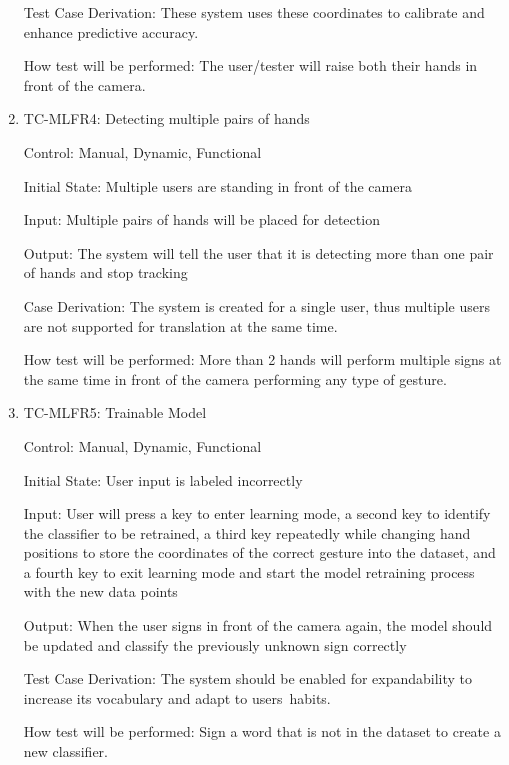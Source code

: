 \documentclass[12pt]{article}
\begin{document}
\begin{enumerate}
Test Case Derivation: These system uses these coordinates to calibrate and enhance predictive accuracy.
    
How test will be performed: The user/tester will raise both their hands in front of the camera.
  
\item{TC-MLFR4: Detecting multiple pairs of hands\\}
  
Control: Manual, Dynamic, Functional
              
Initial State: Multiple users are standing in front of the camera
              
Input: Multiple pairs of hands will be placed for detection
              
Output: The system will tell the user that it is detecting more than one pair of hands and stop tracking
    
   Case Derivation: The system is created for a single user, thus multiple users are not supported for translation at the same time.
    
How test will be performed: More than 2 hands will perform multiple signs at the same time in front of the camera performing any type of gesture.
  
\item{TC-MLFR5: Trainable Model\\}
  
Control: Manual, Dynamic, Functional
              
Initial State: User input is labeled incorrectly
              
Input: User will press a key to enter learning mode, a second key to identify the classifier to be retrained, a third key repeatedly while changing hand positions to store the coordinates of the correct gesture into the dataset, and a fourth key to exit learning mode and start the model retraining process with the new data points
              
Output: When the user signs in front of the camera again, the model should be updated and classify the previously unknown sign correctly
    
Test Case Derivation: The system should be enabled for expandability to increase its vocabulary and adapt to users\textquotesingle \ habits.
    
How test will be performed: Sign a word that is not in the dataset to create a new classifier.
  
\end{enumerate}
  
\end{document}
